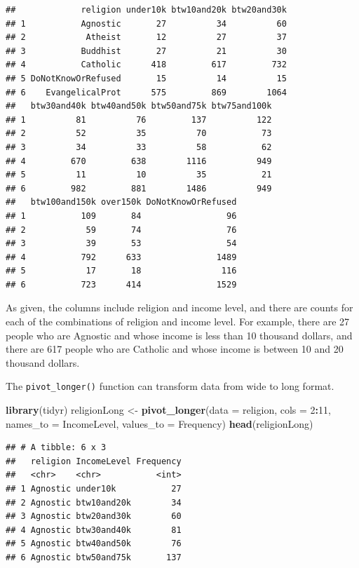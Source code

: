 \documentclass[
]{krantz}
\newenvironment{Shaded}{\begin{snugshade}}{\end{snugshade}}
\newcommand{\DataTypeTok}[1]{\textcolor[rgb]{0.13,0.29,0.53}{#1}}
\newcommand{\DecValTok}[1]{\textcolor[rgb]{0.00,0.00,0.81}{#1}}
\newcommand{\KeywordTok}[1]{\textcolor[rgb]{0.13,0.29,0.53}{\textbf{#1}}}
\newcommand{\NormalTok}[1]{#1}
\newcommand{\OperatorTok}[1]{\textcolor[rgb]{0.81,0.36,0.00}{\textbf{#1}}}
\newcommand{\StringTok}[1]{\textcolor[rgb]{0.31,0.60,0.02}{#1}}
\begin{document}
\begin{verbatim}
##             religion under10k btw10and20k btw20and30k
## 1           Agnostic       27          34          60
## 2            Atheist       12          27          37
## 3           Buddhist       27          21          30
## 4           Catholic      418         617         732
## 5 DoNotKnowOrRefused       15          14          15
## 6    EvangelicalProt      575         869        1064
##   btw30and40k btw40and50k btw50and75k btw75and100k
## 1          81          76         137          122
## 2          52          35          70           73
## 3          34          33          58           62
## 4         670         638        1116          949
## 5          11          10          35           21
## 6         982         881        1486          949
##   btw100and150k over150k DoNotKnowOrRefused
## 1           109       84                 96
## 2            59       74                 76
## 3            39       53                 54
## 4           792      633               1489
## 5            17       18                116
## 6           723      414               1529
\end{verbatim}

As given, the columns include religion and income level, and there are counts for each of the combinations of religion and income level. For example, there are 27 people who are Agnostic and whose income is less than 10 thousand dollars, and there are 617 people who are Catholic and whose income is between 10 and 20 thousand dollars.

The \texttt{pivot\_longer()} function can transform data from wide to long format.

\begin{Shaded}
\begin{Highlighting}[]
\KeywordTok{library}\NormalTok{(tidyr)}
\NormalTok{religionLong \textless{}{-}}\StringTok{ }\KeywordTok{pivot\_longer}\NormalTok{(}\DataTypeTok{data =}\NormalTok{ religion, }\DataTypeTok{cols =} \DecValTok{2}\OperatorTok{:}\DecValTok{11}\NormalTok{, }
                 \DataTypeTok{names\_to =} \StringTok{\textquotesingle{}IncomeLevel\textquotesingle{}}\NormalTok{, }\DataTypeTok{values\_to =} \StringTok{\textquotesingle{}Frequency\textquotesingle{}}\NormalTok{)}
\KeywordTok{head}\NormalTok{(religionLong)}
\end{Highlighting}
\end{Shaded}

\begin{verbatim}
## # A tibble: 6 x 3
##   religion IncomeLevel Frequency
##   <chr>    <chr>           <int>
## 1 Agnostic under10k           27
## 2 Agnostic btw10and20k        34
## 3 Agnostic btw20and30k        60
## 4 Agnostic btw30and40k        81
## 5 Agnostic btw40and50k        76
## 6 Agnostic btw50and75k       137
\end{verbatim}
\end{document}
